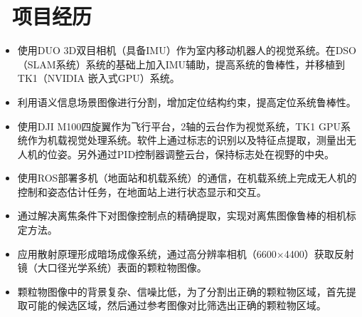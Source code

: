 \documentclass{resume}
\begin{document}
\section{\faUsers\ 项目经历}
\begin{itemize}\small
  \item 使用DUO 3D双目相机（具备IMU）作为室内移动机器人的视觉系统。在DSO（SLAM系统）系统的基础上加入IMU辅助，提高系统的鲁棒性，并移植到TK1（NVIDIA 嵌入式GPU）系统。
  \item 利用语义信息场景图像进行分割，增加定位结构约束，提高定位系统鲁棒性。
\end{itemize}

\begin{itemize}\small
  \item 使用DJI M100四旋翼作为飞行平台，2轴的云台作为视觉系统，TK1 GPU系统作为机载视觉处理系统。软件上通过标志的识别以及特征点提取，测量出无人机的位姿。另外通过PID控制器调整云台，保持标志处在视野的中央。
  \item 使用ROS部署多机（地面站和机载系统）的通信，在机载系统上完成无人机的控制和姿态估计任务，在地面站上进行状态显示和交互。
  \item 通过解决离焦条件下对图像控制点的精确提取，实现对离焦图像鲁棒的相机标定方法。
\end{itemize}

\begin{itemize}\small
\item 应用散射原理形成暗场成像系统，通过高分辨率相机（6600$\times$4400）获取反射镜（大口径光学系统）表面的颗粒物图像。
\item 颗粒物图像中的背景复杂、信噪比低，为了分割出正确的颗粒物区域，首先提取可能的候选区域，然后通过参考图像对比筛选出正确的颗粒物区域。
\end{itemize}
\end{document}
